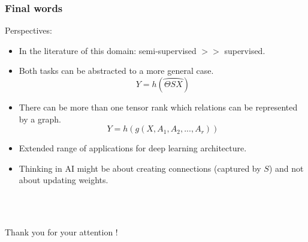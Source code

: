 \documentclass[t,9pt,pdftex]{beamer}
\theoremstyle{definition}
\newcommand{\h}[1]{\hspace{#1pt}}
\begin{document}
\begin{frame}[c, label=current]
  \frametitle{Final words}

  Perspectives:
  \begin{itemize}
    \item In the literature of this domain: semi-supervised $>>$ supervised.
    \item Both tasks can be abstracted to a more general case.
    $$
    Y = h(\wideparen{\Theta S X})
    $$
    \item There can be more than one tensor rank which relations can be represented by a graph.
    $$
    Y = h(g(X, A_1, A_2, ..., A_r))
    $$
    \item Extended range of applications for deep learning architecture.
    \item Thinking in AI might be about creating connections (captured by $S$) and not about updating weights.
  \end{itemize}
  \h{0}\\\h{0}\\
\begin{center}
  {\Large Thank you for your attention !}
\end{center}
\end{frame}
\end{document}
